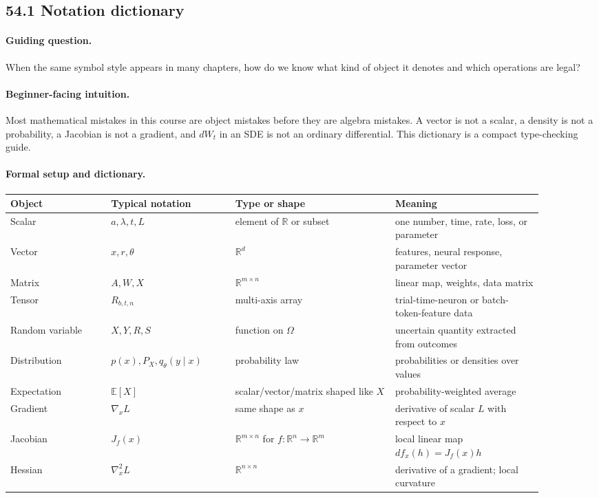 \subsection{54.1 Notation dictionary}

\paragraph{Guiding question.}
When the same symbol style appears in many chapters, how do we know what kind of object it denotes and which operations are legal?

\paragraph{Beginner-facing intuition.}
Most mathematical mistakes in this course are object mistakes before they are algebra mistakes. A vector is not a scalar, a density is not a probability, a Jacobian is not a gradient, and \(dW_t\) in an SDE is not an ordinary differential. This dictionary is a compact type-checking guide.

\paragraph{Formal setup and dictionary.}
\begin{center}
\small
\setlength{\tabcolsep}{2pt}
\renewcommand{\arraystretch}{1.16}
\begin{tabular}{p{0.17\linewidth}p{0.21\linewidth}p{0.27\linewidth}p{0.25\linewidth}}
\toprule
Object & Typical notation & Type or shape & Meaning \\
\midrule
Scalar & \(a,\lambda,t,L\) & element of \(\mathbb R\) or subset & one number, time, rate, loss, or parameter \\
Vector & \(x,r,\theta\) & \(\mathbb R^d\) & features, neural response, parameter vector \\
Matrix & \(A,W,X\) & \(\mathbb R^{m\times n}\) & linear map, weights, data matrix \\
Tensor & \(R_{b,t,n}\) & multi-axis array & trial-time-neuron or batch-token-feature data \\
Random variable & \(X,Y,R,S\) & function on \(\Omega\) & uncertain quantity extracted from outcomes \\
Distribution & \(p(x),P_X,q_\theta(y\mid x)\) & probability law & probabilities or densities over values \\
Expectation & \(\mathbb E[X]\) & scalar/vector/matrix shaped like \(X\) & probability-weighted average \\
Gradient & \(\nabla_x L\) & same shape as \(x\) & derivative of scalar \(L\) with respect to \(x\) \\
Jacobian & \(J_f(x)\) & \(\mathbb R^{m\times n}\) for \(f:\mathbb R^n\to\mathbb R^m\) & local linear map \(df_x(h)=J_f(x)h\) \\
Hessian & \(\nabla_x^2 L\) & \(\mathbb R^{n\times n}\) & derivative of a gradient; local curvature \\
\bottomrule
\end{tabular}
\end{center}

